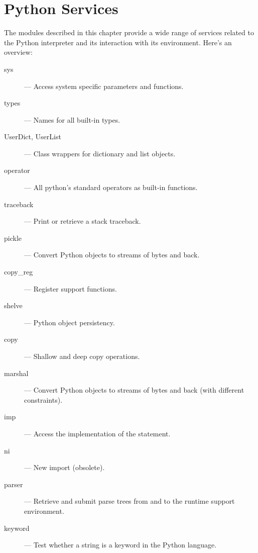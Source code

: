 \chapter{Python Services}

The modules described in this chapter provide a wide range of services
related to the Python interpreter and its interaction with its
environment.  Here's an overview:

\begin{description}

\item[sys]
--- Access system specific parameters and functions.

\item[types]
--- Names for all built-in types.

\item[UserDict, UserList]
--- Class wrappers for dictionary and list objects.

\item[operator]
--- All python's standard operators as built-in functions.

\item[traceback]
--- Print or retrieve a stack traceback.

\item[pickle]
--- Convert Python objects to streams of bytes and back.

\item[copy_reg]
--- Register  support functions.

\item[shelve]
--- Python object persistency.

\item[copy]
--- Shallow and deep copy operations.

\item[marshal]
--- Convert Python objects to streams of bytes and back (with
different constraints).

\item[imp]
--- Access the implementation of the  statement.

\item[ni]
--- New import (obsolete).

\item[parser]
--- Retrieve and submit parse trees from and to the runtime support
environment.

\item[keyword]
--- Test whether a string is a keyword in the Python language.


\end{description}
